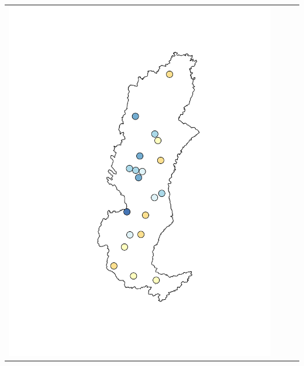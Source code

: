 \begin{landscape}
\begin{tabular}{c c c l}
				\includegraphics[trim= 4cm 2cm 1cm 2cm, clip, scale = 0.35]{./img/pbias_priestley} &

\end{tabular}
\end{landscape}
